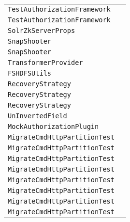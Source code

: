 \begin{center}
\begin{tabular}{ll}
\lstinline/TestAuthorizationFramework/&\raisebox{0pt}{\lstinline/authorizationFrameworkTest()/}\\
\lstinline/TestAuthorizationFramework/&\raisebox{0pt}{\lstinline/authorizationFrameworkTest()/}\\
\lstinline/SolrZkServerProps/&\raisebox{0pt}{\lstinline/parseProperties()/}\\
\lstinline/SnapShooter/&\raisebox{0pt}{\lstinline/deleteNamedSnapshot(ReplicationHandler)/}\\
\lstinline/SnapShooter/&\raisebox{0pt}{\lstinline/deleteNamedSnapshot(ReplicationHandler)/}\\
\lstinline/TransformerProvider/&\raisebox{0pt}{\lstinline/TemplatesgetTemplates()/}\\
\lstinline/FSHDFSUtils/&\raisebox{0pt}{\lstinline/booleansFileClosed(DistributedFileSystemd)/}\\
\lstinline/RecoveryStrategy/&\raisebox{0pt}{\lstinline/Future<RecoveryInfo>replay(SolrCore)/}\\
\lstinline/RecoveryStrategy/&\raisebox{0pt}{\lstinline/Future<RecoveryInfo>replay(SolrCore)/}\\
\lstinline/RecoveryStrategy/&\raisebox{0pt}{\lstinline/Future<RecoveryInfo>replay(SolrCore)/}\\
\lstinline/UnInvertedField/&\raisebox{0pt}{\lstinline/UnInvertedField(Stringfield)/}\\
\lstinline/MockAuthorizationPlugin/&\raisebox{0pt}{\lstinline/AuthorizationResponseauthorize(AuthorizationContext)/}\\
\lstinline/MigrateCmdHttpPartitionTest/&\raisebox{0pt}{\lstinline/migrateKey(ClusterState)/}\\
\lstinline/MigrateCmdHttpPartitionTest/&\raisebox{0pt}{\lstinline/migrateKey(ClusterState)/}\\
\lstinline/MigrateCmdHttpPartitionTest/&\raisebox{0pt}{\lstinline/migrateKey(ClusterState)/}\\
\lstinline/MigrateCmdHttpPartitionTest/&\raisebox{0pt}{\lstinline/migrateKey(ClusterState)/}\\
\lstinline/MigrateCmdHttpPartitionTest/&\raisebox{0pt}{\lstinline/migrateKey(ClusterState)/}\\
\lstinline/MigrateCmdHttpPartitionTest/&\raisebox{0pt}{\lstinline/migrateKey(ClusterState)/}\\
\lstinline/MigrateCmdHttpPartitionTest/&\raisebox{0pt}{\lstinline/migrateKey(ClusterState)/}\\
\lstinline/MigrateCmdHttpPartitionTest/&\raisebox{0pt}{\lstinline/migrateKey(ClusterState)/}\\

\end{tabular}
\end{center}
